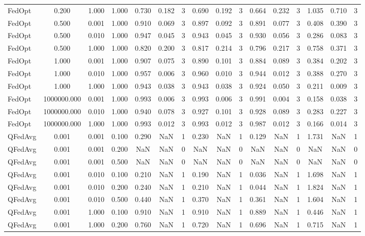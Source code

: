 \begin{table}[htbp]
\begin{tabular}{lccccccccccccccc}
FedOpt & 0.200 & 1.000 & 1.000 & 0.730 & 0.182 & 3 & 0.690 & 0.192 & 3 & 0.664 & 0.232 & 3 & 1.035 & 0.710 & 3 \\
FedOpt & 0.500 & 0.001 & 1.000 & 0.910 & 0.069 & 3 & 0.897 & 0.092 & 3 & 0.891 & 0.077 & 3 & 0.408 & 0.390 & 3 \\
FedOpt & 0.500 & 0.010 & 1.000 & 0.947 & 0.045 & 3 & 0.943 & 0.045 & 3 & 0.930 & 0.056 & 3 & 0.286 & 0.083 & 3 \\
FedOpt & 0.500 & 1.000 & 1.000 & 0.820 & 0.200 & 3 & 0.817 & 0.214 & 3 & 0.796 & 0.217 & 3 & 0.758 & 0.371 & 3 \\
FedOpt & 1.000 & 0.001 & 1.000 & 0.907 & 0.075 & 3 & 0.890 & 0.101 & 3 & 0.884 & 0.089 & 3 & 0.384 & 0.202 & 3 \\
FedOpt & 1.000 & 0.010 & 1.000 & 0.957 & 0.006 & 3 & 0.960 & 0.010 & 3 & 0.944 & 0.012 & 3 & 0.388 & 0.270 & 3 \\
FedOpt & 1.000 & 1.000 & 1.000 & 0.943 & 0.038 & 3 & 0.943 & 0.038 & 3 & 0.924 & 0.050 & 3 & 0.211 & 0.009 & 3 \\
FedOpt & 1000000.000 & 0.001 & 1.000 & 0.993 & 0.006 & 3 & 0.993 & 0.006 & 3 & 0.991 & 0.004 & 3 & 0.158 & 0.038 & 3 \\
FedOpt & 1000000.000 & 0.010 & 1.000 & 0.940 & 0.078 & 3 & 0.927 & 0.101 & 3 & 0.928 & 0.089 & 3 & 0.283 & 0.227 & 3 \\
FedOpt & 1000000.000 & 1.000 & 1.000 & 0.993 & 0.012 & 3 & 0.993 & 0.012 & 3 & 0.987 & 0.012 & 3 & 0.166 & 0.014 & 3 \\
QFedAvg & 0.001 & 0.001 & 0.100 & 0.290 & NaN & 1 & 0.230 & NaN & 1 & 0.129 & NaN & 1 & 1.731 & NaN & 1 \\
QFedAvg & 0.001 & 0.001 & 0.200 & NaN & NaN & 0 & NaN & NaN & 0 & NaN & NaN & 0 & NaN & NaN & 0 \\
QFedAvg & 0.001 & 0.001 & 0.500 & NaN & NaN & 0 & NaN & NaN & 0 & NaN & NaN & 0 & NaN & NaN & 0 \\
QFedAvg & 0.001 & 0.010 & 0.100 & 0.210 & NaN & 1 & 0.190 & NaN & 1 & 0.036 & NaN & 1 & 1.698 & NaN & 1 \\
QFedAvg & 0.001 & 0.010 & 0.200 & 0.240 & NaN & 1 & 0.210 & NaN & 1 & 0.044 & NaN & 1 & 1.824 & NaN & 1 \\
QFedAvg & 0.001 & 0.010 & 0.500 & 0.440 & NaN & 1 & 0.370 & NaN & 1 & 0.361 & NaN & 1 & 1.604 & NaN & 1 \\
QFedAvg & 0.001 & 1.000 & 0.100 & 0.910 & NaN & 1 & 0.910 & NaN & 1 & 0.889 & NaN & 1 & 0.446 & NaN & 1 \\
QFedAvg & 0.001 & 1.000 & 0.200 & 0.760 & NaN & 1 & 0.720 & NaN & 1 & 0.696 & NaN & 1 & 0.715 & NaN & 1 \\

\end{tabular}
\end{table}
